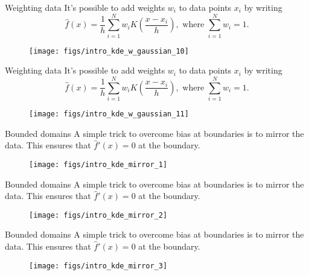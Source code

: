 \documentclass[11pt, aspectratio=149]{beamer}
\theoremstyle{plain}
\begin{document}
\begin{frame}[fragile, t]{Weighting data}
	It's possible to add weights $w_i$ to data points $x_i$ by writing
	\begin{equation*}
	\hat{f}(x) = \frac{1}{h} \sum_{i=1}^{N} w_i K\left(\frac{x - x_i}{h}\right), \text{ where } \sum_{i=1}^{N} w_i = 1.
	\end{equation*}
	\vfill
	\begin{figure}
		\centering
		\texttt{[image: figs/intro\_kde\_w\_gaussian\_10]}
	\end{figure}
\end{frame}


\begin{frame}[fragile, t]{Weighting data}
	It's possible to add weights $w_i$ to data points $x_i$ by writing
	\begin{equation*}
	\hat{f}(x) = \frac{1}{h} \sum_{i=1}^{N} w_i K\left(\frac{x - x_i}{h}\right), \text{ where } \sum_{i=1}^{N} w_i = 1.
	\end{equation*}
	\vfill
	\begin{figure}
		\centering
		\texttt{[image: figs/intro\_kde\_w\_gaussian\_11]}
	\end{figure}
\end{frame}


\begin{frame}[fragile, t]{Bounded domains}
	A simple trick to overcome bias at boundaries is to mirror the data.
	This ensures that $\hat{f}'(x) = 0$ at the boundary.
	\vfill
	\begin{figure}
		\centering
		\texttt{[image: figs/intro\_kde\_mirror\_1]}
	\end{figure}
\end{frame}

\begin{frame}[fragile, t]{Bounded domains}
	A simple trick to overcome bias at boundaries is to mirror the data.
	This ensures that $\hat{f}'(x) = 0$ at the boundary.
	\vfill
	\begin{figure}
		\centering
		\texttt{[image: figs/intro\_kde\_mirror\_2]}
	\end{figure}
\end{frame}

\begin{frame}[fragile, t]{Bounded domains}
	A simple trick to overcome bias at boundaries is to mirror the data.
	This ensures that $\hat{f}'(x) = 0$ at the boundary.
	\vfill
	\begin{figure}
		\centering
		\texttt{[image: figs/intro\_kde\_mirror\_3]}
	\end{figure}
\end{frame}
\end{document}
